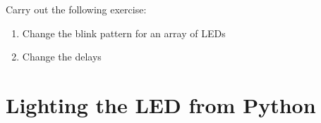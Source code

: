 




\begin{exercise}
Carry out the following exercise:
\begin{enumerate}
\item Change the blink pattern for an array of LEDs
\item Change the delays
\end{enumerate}
\end{exercise}

\section{Lighting the LED from Python}
